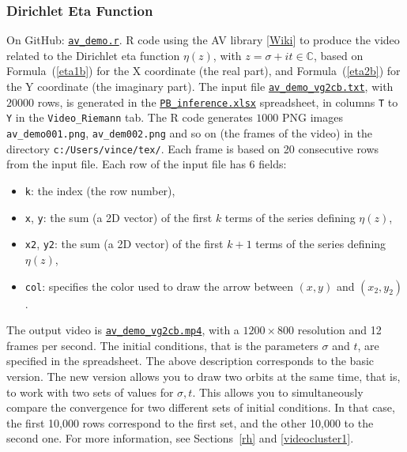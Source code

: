 \documentclass[10pt]{article}
\begin{document}
\subsubsection{Dirichlet Eta Function}\label{etavis}
{On GitHub}: \href{https://github.com/VincentGranville/Point-Processes/blob/main/Videos/av_demo.r}{\texttt{av\_demo.r}}. R code using the AV library [\href{https://ropensci.org/blog/2018/10/06/av-release/}{Wiki}] to produce the video related to the Dirichlet eta function $\eta(z)$, with $z=\sigma+it\in\mathbb{C}$, based on Formula~(\ref{eta1b}) for the X coordinate (the real part), and 
Formula~(\ref{eta2b}) for the Y coordinate (the imaginary part). The input file 
\href{https://github.com/VincentGranville/Point-Processes/blob/main/Videos/av_demo_vg2cb.txt}{\texttt{av\_demo\_vg2cb.txt}}, with $\num{20000}$ rows, is generated in the 
\href{https://github.com/VincentGranville/Point-Processes/tree/main/Spreadsheets}{\texttt{PB\_inference.xlsx}} spreadsheet, in columns \texttt{T} to \texttt{Y} in the 
\texttt{Video\_Riemann} tab. The R code generates $\num{1000}$ PNG images 
\texttt{av\_demo001.png}, \texttt{av\_dem002.png} and so on
(the frames of the video) in the directory \texttt{c:/Users/vince/tex/}. Each frame is based on 20 consecutive rows from the input file. Each row of the input file has 6 fields:
\begin{itemize}
\item \texttt{k}: the index (the row number),
\item \texttt{x}, \texttt{y}: the sum (a 2D vector) of the first $k$ terms of the series defining $\eta(z)$,
\item \texttt{x2}, \texttt{y2}:  the sum (a 2D vector) of the first $k+1$ terms of the series defining $\eta(z)$,
\item \texttt{col}: specifies the color used to draw the arrow between $(x,y)$ and $(x_2,y_2)$.
\end{itemize}
The output video is \href{https://www.youtube.com/watch?v=FUxAeW4JEXA}{\texttt{av\_demo\_vg2cb.mp4}}, with a $1200 \times 800$ resolution and 12 frames per second.
The initial conditions, that is the parameters $\sigma$ and $t$, are specified in the spreadsheet. The above description corresponds to the basic version.
The new version allows you to draw two orbits at the same time, that is, to work with two sets of values for $\sigma,t$. This allows you to 
simultaneously compare the convergence for two different sets of 
initial conditions. In that case, the first 10,000 rows correspond to the first set, and the other 10,000 to the second one. For more information,
see Sections~\ref{rh} and \ref{videocluster1}.
\end{document}
